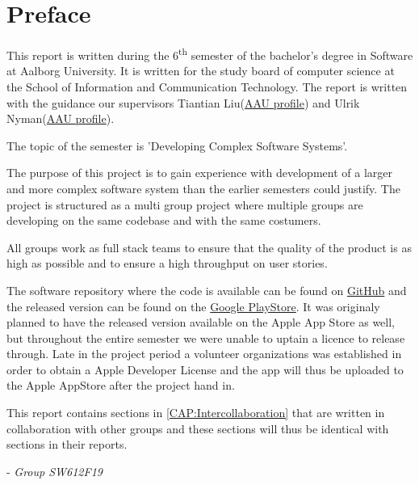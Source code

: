 \chapter*{Preface}
This report is written during the 6\textsuperscript{th} semester of the bachelor's degree in Software at Aalborg University.
It is written for the study board of computer science at the School of Information and Communication Technology.
The report is written with the guidance our supervisors Tiantian Liu(\href{http://personprofil.aau.dk/profil/145323}{AAU profile}) and Ulrik Nyman(\href{http://personprofil.aau.dk/profil/110550}{AAU profile}).

The topic of the semester is 'Developing Complex Software Systems'.

The purpose of this project is to gain experience with development of a larger and more complex software system than the earlier semesters could justify.
The project is structured as a multi group project where multiple groups are developing on the same codebase and with the same costumers.

All groups work as full stack teams to ensure that the quality of the product is as high as possible and to ensure a high throughput on user stories.

The software repository where the code is available can be found on \href{https://github.com/aau-giraf/}{GitHub} and the released version can be found on the \href{https://play.google.com/store/apps/details?id=dk.aau.cs.giraf.weekplanner}{Google PlayStore}.
It was originaly planned to have the released version available on the Apple App Store as well, but throughout the entire semester we were unable to uptain a licence to release through.
Late in the project period a volunteer organizations was established in order to obtain a Apple Developer License and the app will thus be uploaded to the Apple AppStore after the project hand in.

This report contains sections in \autoref{CAP:Intercollaboration} that are written in collaboration with other groups and these sections will thus be identical with sections in their reports.


- \textit{Group SW612F19}

\newpage

